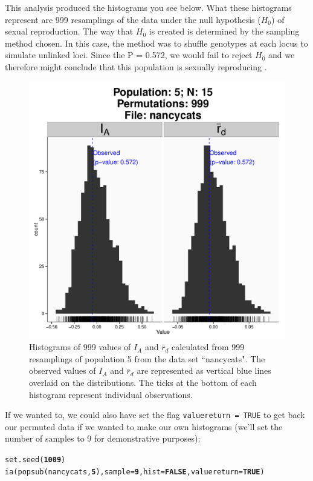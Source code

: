 \documentclass[letterpaper]{article}\usepackage[]{graphicx}\usepackage[]{color}
\makeatletter
\newcommand{\hlnum}[1]{\textcolor[rgb]{0.502,0,0.502}{\textbf{#1}}}%
\newcommand{\hlstd}[1]{\textcolor[rgb]{0,0,0}{#1}}%
\newcommand{\hlkwc}[1]{\textcolor[rgb]{0,0.502,0.753}{#1}}%
\newcommand{\hlkwd}[1]{\textcolor[rgb]{0,0.267,0.4}{#1}}%
\newenvironment{kframe}{%
 \def\at@end@of@kframe{}%
 \ifinner\ifhmode%
  \def\at@end@of@kframe{\end{minipage}}%
  \begin{minipage}{\columnwidth}%
 \fi\fi%
 \def\FrameCommand##1{\hskip\@totalleftmargin \hskip-\fboxsep
 \colorbox{shadecolor}{##1}\hskip-\fboxsep
     \hskip-\linewidth \hskip-\@totalleftmargin \hskip\columnwidth}%
 \MakeFramed {\advance\hsize-\width
   \@totalleftmargin\z@ \linewidth\hsize
   \@setminipage}}%
 {\par\unskip\endMakeFramed%
 \at@end@of@kframe}
\newenvironment{knitrout}{}{} %
\makeatother
\begin{document}
This analysis produced the histograms you see below. What these histograms represent are 999 resamplings of the data under the null hypothesis ($H_0$) of sexual reproduction. The way that $H_0$ is created is determined by the sampling method chosen. In this case, the method was to shuffle genotypes at each locus to simulate unlinked loci. Since the P = 0.572, we would fail to reject $H_0$ and we therefore might conclude that this population is sexually reproducing \cite{Brown:1980} \cite{Smith:1993} \cite{Agapow:2001}.
\begin{figure}[h!]
  \centering
  \caption{\footnotesize Histograms of 999 values of $I_A$ and $\bar{r}_d$ calculated from 999 resamplings of population 5 from the data set ``nancycats". The observed values of $I_A$ and $\bar r_d$ are represented as vertical blue lines overlaid on the distributions. The ticks at the bottom of each histogram represent individual observations.}
  \label{ia_demo_fig}
\begin{knitrout}\footnotesize
{}\color{fgcolor}

{\centering \includegraphics[width=0.5\linewidth]{figure/unnamed-chunk-7} 

}



\end{knitrout}

\end{figure}

If we wanted to, we could also have set the flag \texttt{valuereturn = TRUE} to 
get back our permuted data if we wanted to make our own histograms (we'll set 
the number of samples to 9 for demonstrative purposes):

\begin{knitrout}\footnotesize
{}\color{fgcolor}\begin{kframe}
\begin{alltt}
\hlkwd{set.seed}\hlstd{(}\hlnum{1009}\hlstd{)}
\hlkwd{ia}\hlstd{(}\hlkwd{popsub}\hlstd{(nancycats,} \hlnum{5}\hlstd{),} \hlkwc{sample} \hlstd{=} \hlnum{9}\hlstd{,} \hlkwc{hist} \hlstd{=} \hlnum{FALSE}\hlstd{,} \hlkwc{valuereturn} \hlstd{=} \hlnum{TRUE}\hlstd{)}
\end{alltt}
\end{kframe}
\end{knitrout}
\end{document}
